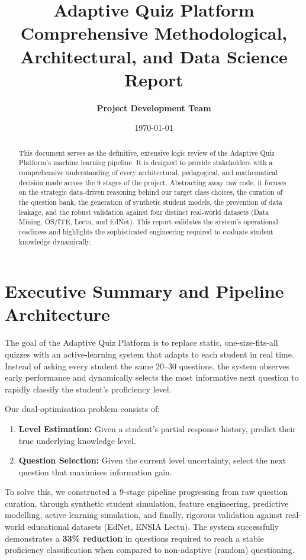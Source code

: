 \documentclass[11pt,a4paper]{article}
\title{\vspace{-2cm}\color{primaryblue}\Huge\textbf{Adaptive Quiz Platform}\\ \Large\vspace{0.5cm}\color{secondaryblue}Comprehensive Methodological, Architectural, and Data Science Report}
\author{\textbf{Project Development Team}}
\date{\today}
\begin{document}
\maketitle
\thispagestyle{fancy}

\begin{abstract}
\noindent This document serves as the definitive, extensive logic review of the Adaptive Quiz Platform's machine learning pipeline. It is designed to provide stakeholders with a comprehensive understanding of every architectural, pedagogical, and mathematical decision made across the 9 stages of the project. Abstracting away raw code, it focuses on the strategic data-driven reasoning behind our target class choices, the curation of the question bank, the generation of synthetic student models, the prevention of data leakage, and the robust validation against four distinct real-world datasets (Data Mining, OS/ITE, Lectu, and EdNet). This report validates the system's operational readiness and highlights the sophisticated engineering required to evaluate student knowledge dynamically.
\end{abstract}

\newpage
\tableofcontents
\newpage

\section{Executive Summary and Pipeline Architecture}
The goal of the Adaptive Quiz Platform is to replace static, one-size-fits-all quizzes with an active-learning system that adapts to each student in real time. Instead of asking every student the same 20--30 questions, the system observes early performance and dynamically selects the most informative next question to rapidly classify the student's proficiency level. 

Our dual-optimisation problem consists of:
\begin{enumerate}
    \item \textbf{Level Estimation:} Given a student's partial response history, predict their true underlying knowledge level.
    \item \textbf{Question Selection:} Given the current level uncertainty, select the next question that maximises information gain.
\end{enumerate}

To solve this, we constructed a 9-stage pipeline progressing from raw question curation, through synthetic student simulation, feature engineering, predictive modelling, active learning simulation, and finally, rigorous validation against real-world educational datasets (EdNet, ENSIA Lectu). The system successfully demonstrates a \textbf{33\% reduction} in questions required to reach a stable proficiency classification when compared to non-adaptive (random) questioning.
\end{document}
